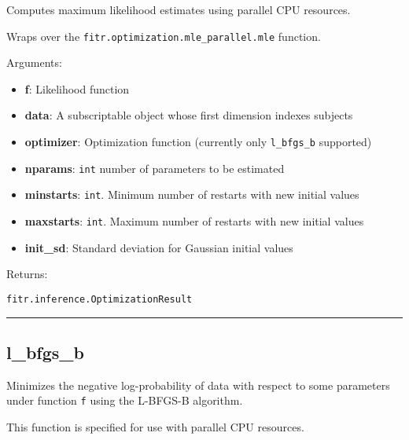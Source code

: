 Computes maximum likelihood estimates using parallel CPU resources.

Wraps over the \texttt{fitr.optimization.mle\_parallel.mle} function.

Arguments:

\begin{itemize}
\tightlist
\item
  \textbf{f}: Likelihood function
\item
  \textbf{data}: A subscriptable object whose first dimension indexes
  subjects
\item
  \textbf{optimizer}: Optimization function (currently only
  \texttt{l\_bfgs\_b} supported)
\item
  \textbf{nparams}: \texttt{int} number of parameters to be estimated
\item
  \textbf{minstarts}: \texttt{int}. Minimum number of restarts with new
  initial values
\item
  \textbf{maxstarts}: \texttt{int}. Maximum number of restarts with new
  initial values
\item
  \textbf{init\_sd}: Standard deviation for Gaussian initial values
\end{itemize}

Returns:

\texttt{fitr.inference.OptimizationResult}

\begin{center}\rule{0.5\linewidth}{\linethickness}\end{center}

\subsection{l\_bfgs\_b}\label{l_bfgs_b}

\begin{Shaded}
\begin{Highlighting}[]
\OperatorTok{=}\OperatorTok{=}\OperatorTok{=}\NormalTok{)}
\end{Highlighting}
\end{Shaded}

Minimizes the negative log-probability of data with respect to some
parameters under function \texttt{f} using the L-BFGS-B algorithm.

This function is specified for use with parallel CPU resources.


